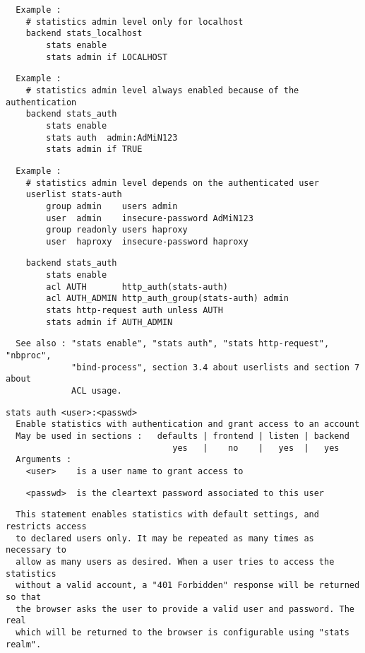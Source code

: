 \begin{verbatim}
  Example :
    # statistics admin level only for localhost
    backend stats_localhost
        stats enable
        stats admin if LOCALHOST
\end{verbatim}

\begin{verbatim}
  Example :
    # statistics admin level always enabled because of the authentication
    backend stats_auth
        stats enable
        stats auth  admin:AdMiN123
        stats admin if TRUE
\end{verbatim}

\begin{verbatim}
  Example :
    # statistics admin level depends on the authenticated user
    userlist stats-auth
        group admin    users admin
        user  admin    insecure-password AdMiN123
        group readonly users haproxy
        user  haproxy  insecure-password haproxy
\end{verbatim}

\begin{verbatim}
    backend stats_auth
        stats enable
        acl AUTH       http_auth(stats-auth)
        acl AUTH_ADMIN http_auth_group(stats-auth) admin
        stats http-request auth unless AUTH
        stats admin if AUTH_ADMIN
\end{verbatim}

\begin{verbatim}
  See also : "stats enable", "stats auth", "stats http-request", "nbproc",
             "bind-process", section 3.4 about userlists and section 7 about
             ACL usage.
\end{verbatim}

\begin{verbatim}
stats auth <user>:<passwd>
  Enable statistics with authentication and grant access to an account
  May be used in sections :   defaults | frontend | listen | backend
                                 yes   |    no    |   yes  |   yes
  Arguments :
    <user>    is a user name to grant access to
\end{verbatim}

\begin{verbatim}
    <passwd>  is the cleartext password associated to this user
\end{verbatim}

\begin{verbatim}
  This statement enables statistics with default settings, and restricts access
  to declared users only. It may be repeated as many times as necessary to
  allow as many users as desired. When a user tries to access the statistics
  without a valid account, a "401 Forbidden" response will be returned so that
  the browser asks the user to provide a valid user and password. The real
  which will be returned to the browser is configurable using "stats realm".
\end{verbatim}

